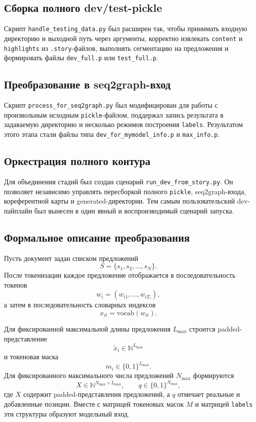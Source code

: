 \documentclass[12pt,a4paper]{article}
\begin{document}
\subsection{Сборка полного dev/test-pickle}

Скрипт \texttt{handle\_testing\_data.py} был расширен так, чтобы принимать входную директорию и выходной путь через аргументы, корректно извлекать \texttt{content} и \texttt{highlights} из \texttt{.story}-файлов, выполнять сегментацию на предложения и формировать файлы \texttt{dev\_full.p} или \texttt{test\_full.p}.

\subsection{Преобразование в seq2graph-вход}

Скрипт \texttt{process\_for\_seq2graph.py} был модифицирован для работы с произвольным исходным \texttt{pickle}-файлом, поддержал запись результата в задаваемую директорию и несколько режимов построения \texttt{labels}. Результатом этого этапа стали файлы типа \texttt{dev\_for\_mymodel\_info.p} и \texttt{max\_info.p}.

\subsection{Оркестрация полного контура}

Для объединения стадий был создан сценарий \texttt{run\_dev\_from\_story.py}. Он позволяет независимо управлять пересборкой полного \texttt{pickle}, seq2graph-входа, кореферентной карты и generated-директории. Тем самым пользовательский dev-пайплайн был вынесен в один явный и воспроизводимый сценарий запуска.

\subsection{Формальное описание преобразования}

Пусть документ задан списком предложений
\[
S = \{s_1, s_2, \dots, s_N\}.
\]
После токенизации каждое предложение отображается в последовательность токенов
\[
w_i = (w_{i1}, \dots, w_{iT_i}),
\]
а затем в последовательность словарных индексов
\[
x_{it} = \mathrm{vocab}(w_{it}).
\]

Для фиксированной максимальной длины предложения $L_{\max}$ строится padded-представление
\[
\tilde{x}_i \in \mathbb{N}^{L_{\max}}
\]
и токеновая маска
\[
m_i \in \{0,1\}^{L_{\max}}.
\]
Для фиксированного максимального числа предложений $N_{\max}$ формируются
\[
X \in \mathbb{N}^{N_{\max} \times L_{\max}},
\qquad
q \in \{0,1\}^{N_{\max}},
\]
где $X$ содержит padded-представления предложений, а $q$ отмечает реальные и добавленные позиции. Вместе с матрицей токеновых масок $M$ и матрицей \texttt{labels} эти структуры образуют модельный вход.
\end{document}
